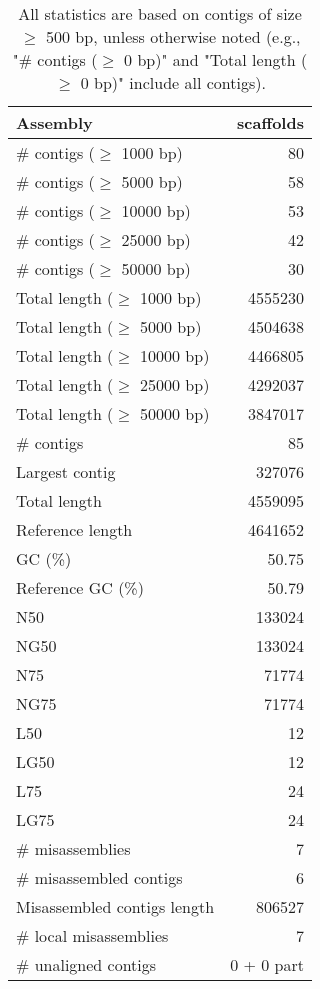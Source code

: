 \documentclass[12pt,a4paper]{article}
\begin{document}
\begin{table}[ht]
\begin{center}
\caption{All statistics are based on contigs of size $\geq$ 500 bp, unless otherwise noted (e.g., "\# contigs ($\geq$ 0 bp)" and "Total length ($\geq$ 0 bp)" include all contigs).}
\begin{tabular}{|l*{1}{|r}|}
\hline
Assembly & scaffolds \\ \hline
\# contigs ($\geq$ 1000 bp) & 80 \\ \hline
\# contigs ($\geq$ 5000 bp) & 58 \\ \hline
\# contigs ($\geq$ 10000 bp) & 53 \\ \hline
\# contigs ($\geq$ 25000 bp) & 42 \\ \hline
\# contigs ($\geq$ 50000 bp) & 30 \\ \hline
Total length ($\geq$ 1000 bp) & 4555230 \\ \hline
Total length ($\geq$ 5000 bp) & 4504638 \\ \hline
Total length ($\geq$ 10000 bp) & 4466805 \\ \hline
Total length ($\geq$ 25000 bp) & 4292037 \\ \hline
Total length ($\geq$ 50000 bp) & 3847017 \\ \hline
\# contigs & 85 \\ \hline
Largest contig & 327076 \\ \hline
Total length & 4559095 \\ \hline
Reference length & 4641652 \\ \hline
GC (\%) & 50.75 \\ \hline
Reference GC (\%) & 50.79 \\ \hline
N50 & 133024 \\ \hline
NG50 & 133024 \\ \hline
N75 & 71774 \\ \hline
NG75 & 71774 \\ \hline
L50 & 12 \\ \hline
LG50 & 12 \\ \hline
L75 & 24 \\ \hline
LG75 & 24 \\ \hline
\# misassemblies & 7 \\ \hline
\# misassembled contigs & 6 \\ \hline
Misassembled contigs length & 806527 \\ \hline
\# local misassemblies & 7 \\ \hline
\# unaligned contigs & 0 + 0 part \\ \hline

\end{tabular}
\end{center}
\end{table}
\end{document}
